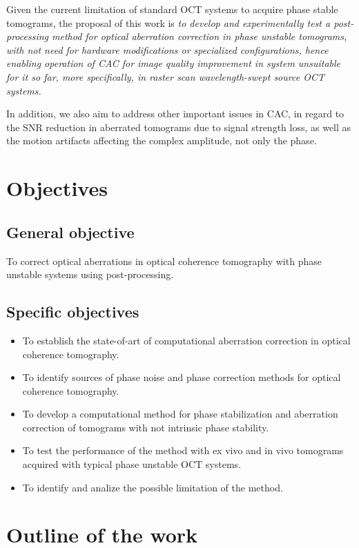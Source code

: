 Given the current limitation of standard OCT systems to acquire phase stable tomograms, the proposal of this work is \textit{to develop and experimentally test a post-processing method for optical aberration correction in phase unstable tomograms, with not need for hardware modifications or specialized configurations, hence enabling operation of CAC for image quality improvement in system unsuitable for it so far, more specifically, in raster scan wavelength-swept source OCT systems.}

In addition, we also aim to address other important issues in CAC, in regard to the SNR reduction in aberrated tomograms due to signal strength loss, as well as the motion artifacts affecting the complex amplitude, not only the phase.

\section{Objectives}

\subsection{General objective}

To correct optical aberrations in optical coherence tomography with phase unstable systems using post-processing.

\subsection{Specific objectives}

\begin{itemize}
    \item To establish the state-of-art of computational aberration correction in optical coherence tomography.
    \item To identify sources of phase noise and phase correction methods for optical coherence tomography.
    \item To develop a computational method for phase stabilization and aberration correction of tomograms with not intrinsic phase stability.
    \item To test the performance of the method with ex vivo and in vivo tomograms acquired with typical phase unstable OCT systems.
    \item To identify and analize the possible limitation of the method.
\end{itemize}

\section{Outline of the work}

